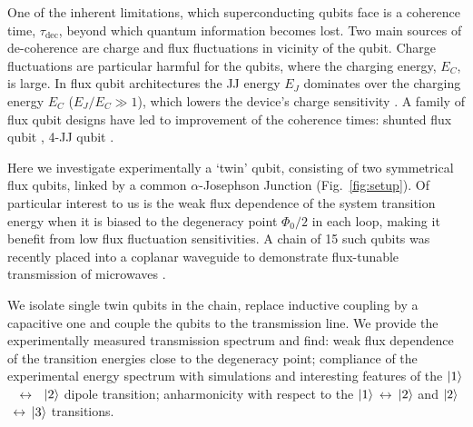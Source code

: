\documentclass[%
reprint,
superscriptaddress,
bibnotes,
amsmath,
amssymb,
aps,
showkeys,
prb,
]{revtex4-2}
\newcommand{\iket}[1]{\ensuremath{\Ket{#1}}}
\newcommand{\ilra}{\ensuremath{\,\leftrightarrow\,}}
\begin{document}
One  of the  inherent limitations,  which  superconducting qubits  face is  a coherence  time,
$\tau_{\text{dec}}$, beyond  which quantum information  becomes lost. Two main sources of de-coherence are charge and flux fluctuations in vicinity of the qubit. Charge fluctuations are particular harmful for the qubits, where the charging energy, $E_C$, is large. In  flux qubit
architectures the JJ  energy $E_J$ dominates over  the charging energy $E_C$  ($E_J/E_C \gg 1$),
which lowers  the device's  charge sensitivity  \cite{Orlando_1999,Chiorescu_2003,Mooij_1999}.  A
family  of flux qubit designs  have led to  improvement of the coherence  times: shunted
flux qubit \cite{Yan_2016} , 4-JJ qubit \cite{Qiu_2016,Pop_2014}.


Here we investigate experimentally a `twin'  qubit, consisting of two symmetrical flux qubits,
linked by a common $ \alpha$-Josephson Junction  (Fig.~\ref{fig:setup}).  Of particular interest to us is the weak flux dependence of the
system transition  energy when  it is  biased to the  degeneracy point  $\Phi_0/2 $ in each loop,  making it
benefit from low flux fluctuation sensitivities. A chain of 15 such qubits
was recently  placed into  a coplanar  waveguide to  demonstrate flux-tunable  transmission of
microwaves \cite{Shulga_2018}.  
 
We  isolate single twin qubits in the chain, replace inductive coupling by a capacitive one and couple the qubits to the  transmission line. We
provide the experimentally measured transmission spectrum and find: weak flux
dependence  of the  transition  energies close  to  the degeneracy  point;  compliance of  the
experimental   energy   spectrum   with   simulations  and   interesting   features   of   the
\iket{1}~\ilra~\iket{2} dipole transition; anharmonicity
with respect  to the  \iket{1}\ilra\iket{2} and  \iket{2}\ilra\iket{3} transitions.
\end{document}
